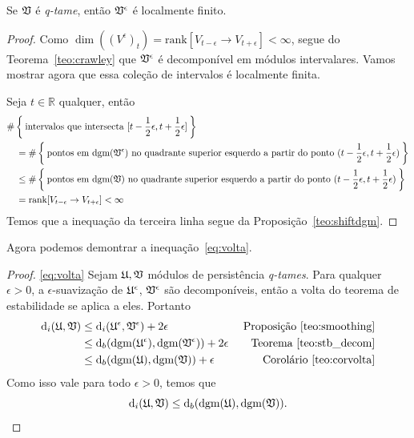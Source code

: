 \begin{propo}\label{teo:final_prop}
    Se $\mathfrak{V}$ é \textit{q-tame}, então $\mathfrak{V}^\epsilon$ é localmente finito. 
\end{propo}
\begin{proof}
    Como $\dim((V^\epsilon)_t) = \text{rank}[V_{t-\epsilon} \to V_{t+\epsilon}] < \infty$, segue do 
    Teorema~\ref{teo:crawley} que $\mathfrak{V}^\epsilon$ é decomponível em módulos intervalares. Vamos mostrar
    agora que essa coleção de intervalos é localmente finita. 

    Seja $t\in\mathbb{R}$ qualquer, então
    \begin{align*}
        & \#\Set{\text{intervalos que intersecta } [t-\frac{1}{2}\epsilon, t + \frac{1}{2}\epsilon]} \\
        &\quad = \#\Set{\text{pontos em } \text{dgm}(\mathfrak{V}^\epsilon) \text{ no quadrante superior esquerdo a partir
            do ponto } (t-\frac{1}{2}\epsilon, t + \frac{1}{2}\epsilon)} \\
        & \quad \leq \#\Set{\text{pontos em } \text{dgm}(\mathfrak{V}) \text{ no quadrante superior esquerdo a partir
            do ponto } (t-\frac{1}{2}\epsilon, t + \frac{1}{2}\epsilon)} \\
        & \quad = \text{rank}[V_{t-\epsilon} \to V_{t+\epsilon}] < \infty
    \end{align*}
    Temos que a inequação da terceira linha segue da Proposição~\ref{teo:shiftdgm}. 
\end{proof}
Agora podemos demontrar a inequação~\ref{eq:volta}.
\begin{proof}{\ref{eq:volta}}
    Sejam $\mathfrak{U}, \mathfrak{V}$ módulos de persistência \textit{q-tames}. Para qualquer $\epsilon > 0$, 
    a $\epsilon$-suavização de $\mathfrak{U}^\epsilon$, $\mathfrak{V}^\epsilon$ são decomponíveis, então a
    volta do teorema de estabilidade se aplica a eles. Portanto
    \begin{align*}
        \text{d}_i(\mathfrak{U}, \mathfrak{V}) & \leq \text{d}_i(\mathfrak{U}^\epsilon, \mathfrak{V}^\epsilon) + 2\epsilon & 
                              \text{ Proposição~\ref{teo:smoothing}} \\
                            & \leq \text{d}_b(\text{dgm}(\mathfrak{U}^\epsilon), \text{dgm}(\mathfrak{V}^\epsilon)) + 2\epsilon & 
                              \text{ Teorema~\ref{teo:stb_decom}} \\
                            & \leq \text{d}_b(\text{dgm}(\mathfrak{U}), \text{dgm}(\mathfrak{V})) + \epsilon & \text{ Corolário~\ref{teo:corvolta}} \\
    \end{align*}
    Como isso vale para todo $\epsilon > 0$, temos que
    \begin{equation*}
        \text{d}_i(\mathfrak{U}, \mathfrak{V}) \leq \text{d}_b(\text{dgm}(\mathfrak{U}), \text{dgm}(\mathfrak{V})).
    \end{equation*}
\end{proof}

